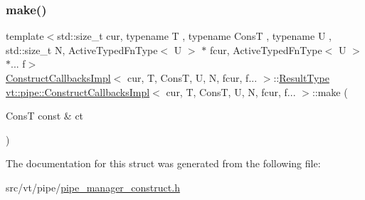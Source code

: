 \subsubsection{\texorpdfstring{make()}{make()}}
{\footnotesize\ttfamily template$<$std\+::size\+\_\+t cur, typename T , typename ConsT , typename U , std\+::size\+\_\+t N, Active\+Typed\+Fn\+Type$<$ U $>$ $\ast$ fcur, Active\+Typed\+Fn\+Type$<$ U $>$ $\ast$... f$>$ \\
\hyperlink{structvt_1_1pipe_1_1_construct_callbacks_impl}{Construct\+Callbacks\+Impl}$<$ cur, T, ConsT, U, N, fcur, f... $>$\+::\hyperlink{structvt_1_1pipe_1_1_construct_callbacks_impl_3_01cur_00_01_t_00_01_cons_t_00_01_u_00_01_n_00_01fcur_00_01f_8_8_8_01_4_a294fdd76c66fb6d0b700474df14313ab}{Result\+Type} \hyperlink{structvt_1_1pipe_1_1_construct_callbacks_impl}{vt\+::pipe\+::\+Construct\+Callbacks\+Impl}$<$ cur, T, ConsT, U, N, fcur, f... $>$\+::make (\begin{DoxyParamCaption}\item[{ConsT const \&}]{ct }\end{DoxyParamCaption})\hspace{0.3cm}{\ttfamily [static]}}



The documentation for this struct was generated from the following file\+:\begin{DoxyCompactItemize}
\item 
src/vt/pipe/\hyperlink{pipe__manager__construct_8h}{pipe\+\_\+manager\+\_\+construct.\+h}\end{DoxyCompactItemize}
